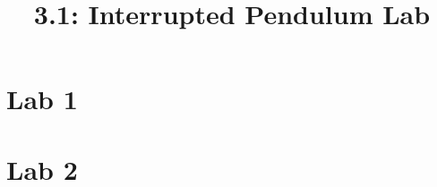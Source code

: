 \documentclass{article}
\title{3.1: Interrupted Pendulum Lab}
\begin{document}
\section{Lab 1}
\section{Lab 2}
\end{document}
